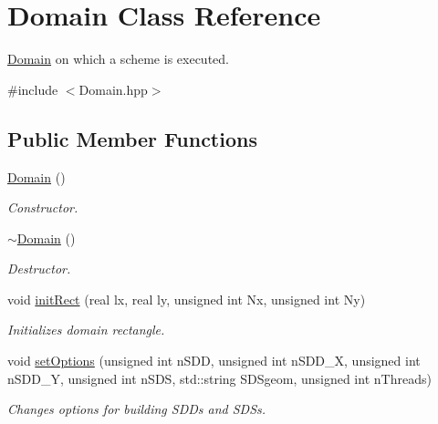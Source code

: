 \hypertarget{classDomain}{}\section{Domain Class Reference}
\label{classDomain}


\hyperlink{classDomain}{Domain} on which a scheme is executed.  




{\ttfamily \#include $<$Domain.\+hpp$>$}

\subsection*{Public Member Functions}
\begin{DoxyCompactItemize}
\item 
\mbox{\label{classDomain_a6adccae537e53d4fde2b70f875e6b8d0}} 
\hyperlink{classDomain_a6adccae537e53d4fde2b70f875e6b8d0}{Domain} ()
\begin{DoxyCompactList}\small\item\em Constructor. \end{DoxyCompactList}\item 
\mbox{\label{classDomain_a29cec9afb2e54c810ba1f3c1a49543a8}} 
\hyperlink{classDomain_a29cec9afb2e54c810ba1f3c1a49543a8}{$\sim$\+Domain} ()
\begin{DoxyCompactList}\small\item\em Destructor. \end{DoxyCompactList}\item 
void \hyperlink{classDomain_a853266061b629ff1f920b46c06c478d6}{init\+Rect} (real lx, real ly, unsigned int Nx, unsigned int Ny)
\begin{DoxyCompactList}\small\item\em Initializes domain rectangle. \end{DoxyCompactList}\item 
void \hyperlink{classDomain_a10a5e8384b21bb3c968699c2a6c89bf7}{set\+Options} (unsigned int n\+S\+DD, unsigned int n\+S\+D\+D\+\_\+X, unsigned int n\+S\+D\+D\+\_\+Y, unsigned int n\+S\+DS, std\+::string S\+D\+Sgeom, unsigned int n\+Threads)
\begin{DoxyCompactList}\small\item\em Changes options for building S\+D\+Ds and S\+D\+Ss. \end{DoxyCompactList}\item 

\end{DoxyCompactItemize}
